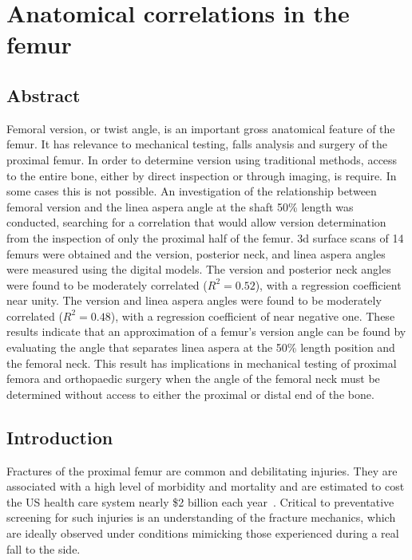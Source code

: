 \chapter{Anatomical correlations in the femur}
\label{ch:version}

\section{Abstract}
\label{sec:version_abstract}
Femoral version, or twist angle, is an important gross anatomical feature of the femur.
It has relevance to mechanical testing, falls analysis and surgery of the proximal femur.
In order to determine version using traditional methods, access to the entire bone, either by direct inspection or through imaging, is require.
In some cases this is not possible.
An investigation of the relationship between femoral version and the linea aspera angle at the shaft 50\% length was conducted, searching for a correlation that would allow version determination from the inspection of only the proximal half of the femur.
\acs{3d} surface scans of 14 femurs were obtained and the version, posterior neck, and linea aspera angles were measured using the digital models.
The version and posterior neck angles were found to be moderately correlated ($R^2 = 0.52$), with a regression coefficient near unity.
The version and linea aspera angles were found to be moderately correlated ($R^2 = 0.48$), with a regression coefficient of near negative one.
These results indicate that an approximation of a femur's version angle can be found by evaluating the angle that separates linea aspera at the 50\% length position and the femoral neck.
This result has implications in mechanical testing of proximal femora and orthopaedic surgery when the angle of the femoral neck must be determined without access to either the proximal or distal end of the bone.

\section{Introduction}
\label{sec:version_intro}
Fractures of the proximal femur are common and debilitating injuries.
They are associated with a high level of morbidity and mortality and are estimated to cost the US health care system nearly \$2 billion each year~\citep{abrahamsen_excess_2009, song_cost_2011}.
Critical to preventative screening for such injuries is an understanding of the fracture mechanics, which are ideally observed under conditions mimicking those experienced during a real fall to the side.

